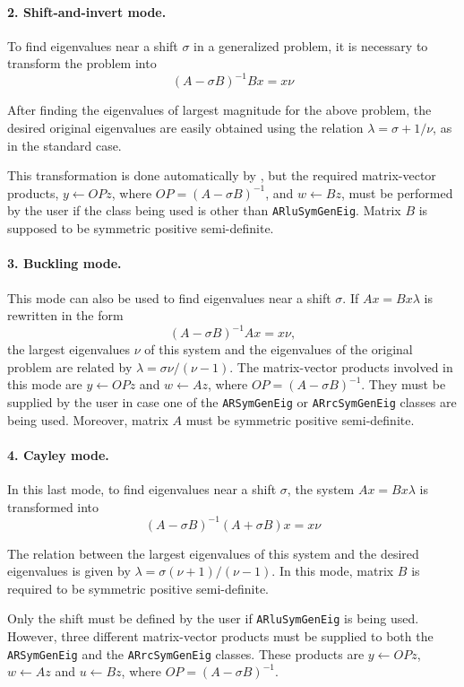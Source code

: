 \paragraph{2. Shift-and-invert mode.}
To find eigenvalues near a shift $\sigma$ in a generalized problem, it is necessary to transform the problem into
\[(A-\sigma B)^{-1} Bx=x\nu\]

After finding the eigenvalues of largest magnitude for the above problem, the desired original eigenvalues are easily obtained using the relation $\lambda =\sigma + 1/\nu$, as in the standard case. 

This transformation is done automatically by \ARPP{}, but the required matrix-vector products, $y \leftarrow OPz$, where $OP=(A-\sigma B)^{-1}$, and $w \leftarrow Bz$, must be performed by the user if the class being used is other than \texttt{ARluSymGenEig}. Matrix $B$ is supposed to be symmetric positive semi-definite.

\paragraph{3. Buckling mode.}
This mode can also be used to find eigenvalues near a shift $\sigma$. If $Ax=Bx\lambda$ is rewritten in the form
\[(A-\sigma B)^{-1} Ax=x\nu,\]
the largest eigenvalues $\nu$ of this system and the eigenvalues of the original problem are related by $\lambda =\sigma \nu /(\nu -1)$. The matrix-vector products involved in this mode are $y \leftarrow OPz$ and $w \leftarrow Az$, where $OP=(A-\sigma B)^{-1}$. They must be supplied by the user in case one of the \texttt{ARSymGenEig} or \texttt{ARrcSymGenEig} classes are being used. Moreover, matrix $A$ must be symmetric positive semi-definite.

\paragraph{4. Cayley mode.}
In this last mode, to find eigenvalues near a shift $\sigma$, the system $Ax=Bx\lambda$ is transformed into
\[(A-\sigma B)^{-1} (A+\sigma B)x=x\nu\]

The relation between the largest eigenvalues of this system and the desired eigenvalues is given by $\lambda =\sigma (\nu +1) /(\nu -1)$. In this mode, matrix $B$ is required to be symmetric positive semi-definite. 

Only the shift must be defined by the user if \texttt{ARluSymGenEig} is being used. However, three different matrix-vector products must be supplied to both the \texttt{ARSymGenEig} and the \texttt{ARrcSymGenEig} classes. These products are $y \leftarrow OPz$, $w \leftarrow Az$ and $u \leftarrow Bz$, where $OP=(A-\sigma B)^{-1}$.

